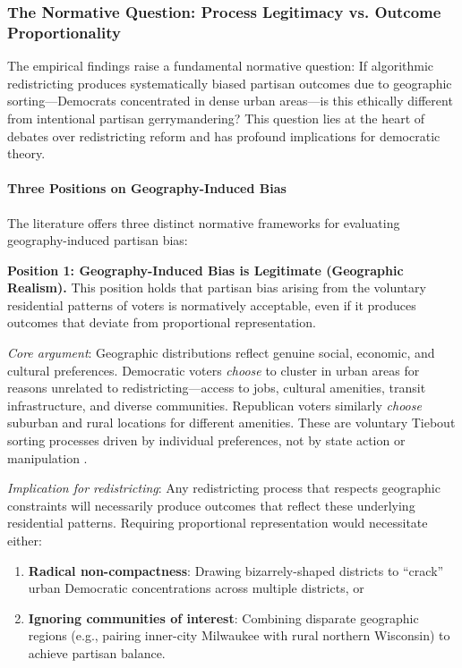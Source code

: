 
\subsubsection{The Normative Question: Process Legitimacy vs. Outcome Proportionality}

The empirical findings raise a fundamental normative question: If algorithmic redistricting produces systematically biased partisan outcomes due to geographic sorting---Democrats concentrated in dense urban areas---is this ethically different from intentional partisan gerrymandering? This question lies at the heart of debates over redistricting reform and has profound implications for democratic theory.

\paragraph{Three Positions on Geography-Induced Bias}

The literature offers three distinct normative frameworks for evaluating geography-induced partisan bias:

\textbf{Position 1: Geography-Induced Bias is Legitimate (Geographic Realism).}
This position holds that partisan bias arising from the voluntary residential patterns of voters is normatively acceptable, even if it produces outcomes that deviate from proportional representation.

\textit{Core argument}: Geographic distributions reflect genuine social, economic, and cultural preferences. Democratic voters \textit{choose} to cluster in urban areas for reasons unrelated to redistricting---access to jobs, cultural amenities, transit infrastructure, and diverse communities. Republican voters similarly \textit{choose} suburban and rural locations for different amenities. These are voluntary Tiebout sorting processes driven by individual preferences, not by state action or manipulation \citep{tiebout1956,rodden2019}.

\textit{Implication for redistricting}: Any redistricting process that respects geographic constraints will necessarily produce outcomes that reflect these underlying residential patterns. Requiring proportional representation would necessitate either:
\begin{enumerate}[label=(\alph*)]
\item \textbf{Radical non-compactness}: Drawing bizarrely-shaped districts to ``crack'' urban Democratic concentrations across multiple districts, or
\item \textbf{Ignoring communities of interest}: Combining disparate geographic regions (e.g., pairing inner-city Milwaukee with rural northern Wisconsin) to achieve partisan balance.
\end{enumerate}

